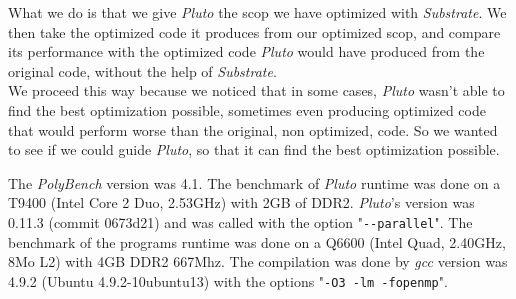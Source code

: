 \documentclass[paper=a4, fontsize=11.5pt]{scrartcl}
\numberwithin{equation}{section}        %
\numberwithin{figure}{section}          %
\numberwithin{table}{section}               %
\begin{document}
What we do is that we give \textit{Pluto} the scop we have optimized with \textit{Substrate}.
We then take the optimized code it produces from our optimized scop,
and compare its performance with the optimized code \textit{Pluto} would have produced from
the original code, without the help of \textit{Substrate}.\\
We proceed this way because we noticed that in some cases, \textit{Pluto} wasn't able
to find the best optimization possible, sometimes even producing optimized code that would
perform worse than the original, non optimized, code. So we wanted to see if we could
guide \textit{Pluto}, so that it can find the best optimization possible.

\bigskip

The \textit{PolyBench} version was 4.1.
The benchmark of \textit{Pluto} runtime was done on a T9400 (Intel Core 2 Duo, 2.53GHz) with 2GB of DDR2.
\textit{Pluto}'s version was 0.11.3 (commit 0673d21) and was called with the option "\verb'--parallel'".
The benchmark of the programs runtime was done on a Q6600 (Intel Quad, 2.40GHz, 8Mo L2) with 4GB DDR2 667Mhz.
The compilation was done by \textit{gcc} version was 4.9.2 (Ubuntu 4.9.2-10ubuntu13) 
with the options "\verb'-O3 -lm -fopenmp'".

\bigskip
\end{document}
